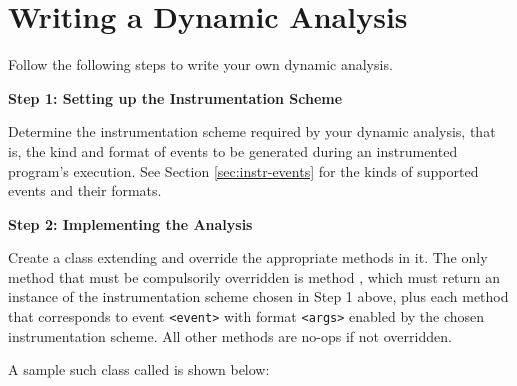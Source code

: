 \section{Writing a Dynamic Analysis}
\label{sec:writing-dynamic-analysis}

Follow the following steps to write your own dynamic analysis.

{\bf Step 1: Setting up the Instrumentation Scheme}

Determine the instrumentation scheme required by your dynamic analysis, that is,
the kind and format of events to be generated during an instrumented program's
execution. See Section \ref{sec:instr-events} 
for the kinds of supported events and their formats.

{\bf Step 2: Implementing the Analysis}

Create a class extending  and override
the appropriate methods in it.
The only method that must be compulsorily overridden is method ,
which must return an instance of the instrumentation scheme chosen in Step 1 above,
plus each  method that corresponds to event {\tt <event>}
with format {\tt <args>} enabled by the chosen instrumentation scheme.
All other methods are no-ops if not overridden.

A sample such class called  is shown below:


